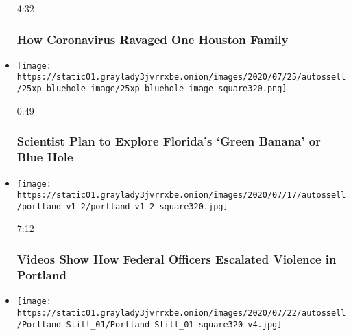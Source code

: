 \begin{itemize}
  4:32

  \hypertarget{how-coronavirus-ravaged-one-houston-family}{%
  \subsubsection{How Coronavirus Ravaged One Houston
  Family}\label{how-coronavirus-ravaged-one-houston-family}}
\item
  \href{https://www.nytimes3xbfgragh.onion/video/us/100000007255617/florida-green-banana-bluehole.html?action=click\&module=video-series-bar\&region=header\&pgtype=Article\&playlistId=video/u-s}{}

  \texttt{[image: https://static01.graylady3jvrrxbe.onion/images/2020/07/25/autossell/25xp-bluehole-image/25xp-bluehole-image-square320.png]}

  0:49

  \hypertarget{scientist-plan-to-explore-floridas-green-banana-or-blue-hole}{%
  \subsubsection{Scientist Plan to Explore Florida's `Green Banana' or
  Blue
  Hole}\label{scientist-plan-to-explore-floridas-green-banana-or-blue-hole}}
\item
  \href{https://www.nytimes3xbfgragh.onion/video/us/100000007243995/portland-protests-federal-government.html?action=click\&module=video-series-bar\&region=header\&pgtype=Article\&playlistId=video/u-s}{}

  \texttt{[image: https://static01.graylady3jvrrxbe.onion/images/2020/07/17/autossell/portland-v1-2/portland-v1-2-square320.jpg]}

  7:12

  \hypertarget{videos-show-how-federal-officers-escalated-violence-in-portland}{%
  \subsubsection{Videos Show How Federal Officers Escalated Violence in
  Portland}\label{videos-show-how-federal-officers-escalated-violence-in-portland}}
\item
  \href{https://www.nytimes3xbfgragh.onion/video/us/100000007250985/they-pushed-portland-too-far-trump-crackdown-strengthens-protests.html?action=click\&module=video-series-bar\&region=header\&pgtype=Article\&playlistId=video/u-s}{}

  \texttt{[image: https://static01.graylady3jvrrxbe.onion/images/2020/07/22/autossell/Portland-Still\_01/Portland-Still\_01-square320-v4.jpg]}


\end{itemize}
